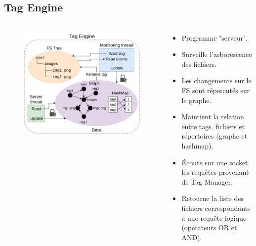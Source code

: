 \documentclass[10pt]{beamer}
\begin{document}
\subsection{Tag Engine}
\begin{frame}
    \frametitle{\subsecname}
    \begin{columns}[T]
        \pause
        \begin{column}{.6\textwidth}
            \begin{figure}
                \begin{center}
                    \includegraphics[width=1\textwidth]{images/tag_engine2.png}
                \end{center}
            \end{figure}
        \end{column}
        \pause
        \begin{column}{.4\textwidth}
        \fontsize{8pt}{9}\selectfont
            \begin{itemize}
                \item Programme "serveur".
                \item Surveille l'arborescence des fichiers.
                \item Les changements sur le FS sont répercutés sur le graphe.
                \item Maintient la relation entre tags, fichiers et répertoires (graphe et hashmap).
                \item Écoute sur une socket les requêtes provenant de Tag Manager.
                \item Retourne la liste des fichiers correspondants à une requête logique (opérateurs OR et AND).
            \end{itemize}
        \end{column}
    \end{columns}
\end{frame}
\end{document}
